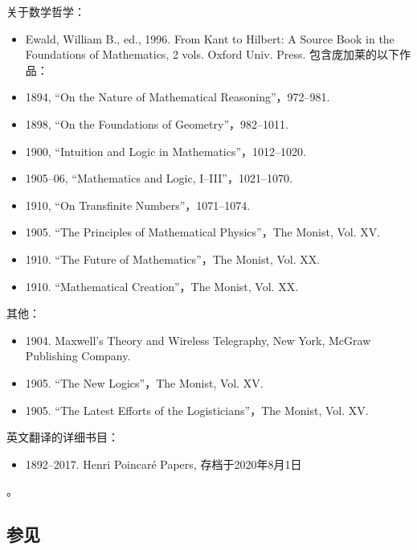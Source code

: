 关于数学哲学：
\begin{itemize}
\item Ewald, William B., ed., 1996. From Kant to Hilbert: A Source Book in the Foundations of Mathematics, 2 vols. Oxford Univ. Press. 包含庞加莱的以下作品：  
\item 1894, “On the Nature of Mathematical Reasoning”，972–981.  
\item 1898, “On the Foundations of Geometry”，982–1011.  
\item 1900, “Intuition and Logic in Mathematics”，1012–1020.  
\item 1905–06, “Mathematics and Logic, I–III”，1021–1070.  
\item 1910, “On Transfinite Numbers”，1071–1074.  
\item 1905. “The Principles of Mathematical Physics”，The Monist, Vol. XV.  
\item 1910. “The Future of Mathematics”，The Monist, Vol. XX.  
\item 1910. “Mathematical Creation”，The Monist, Vol. XX.
\end{itemize}

其他：
\begin{itemize}
\item 1904. Maxwell's Theory and Wireless Telegraphy, New York, McGraw Publishing Company.  
\item 1905. “The New Logics”，The Monist, Vol. XV.  
\item 1905. “The Latest Efforts of the Logisticians”，The Monist, Vol. XV.
\end{itemize}

英文翻译的详细书目：
\begin{itemize}
\item 1892–2017. Henri Poincaré Papers, 存档于2020年8月1日
\end{itemize}。
\subsection{参见} 
